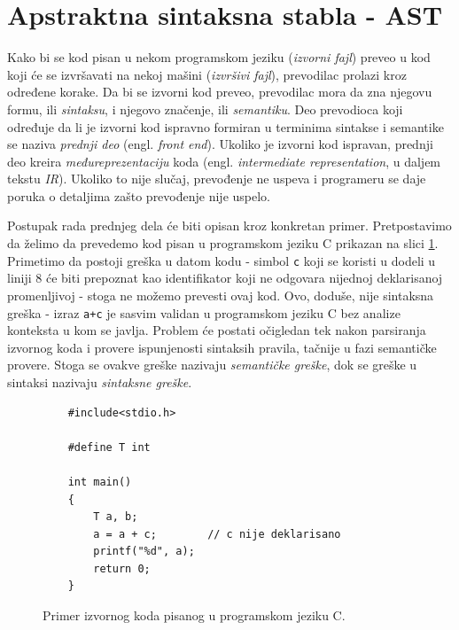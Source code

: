 \section{Apstraktna sintaksna stabla - AST}
\label{sec:AST}

Kako bi se kod pisan u nekom programskom jeziku (\emph{izvorni fajl}) preveo u kod koji će se izvršavati na nekoj mašini (\emph{izvršivi fajl}), prevodilac prolazi kroz određene korake. Da bi se izvorni kod preveo, prevodilac mora da zna njegovu formu, ili \emph{sintaksu}, i njegovo značenje, ili \emph{semantiku}. Deo prevodioca koji određuje da li je izvorni kod ispravno formiran u terminima sintakse i semantike se naziva \emph{prednji deo} (engl. \emph{front end}). Ukoliko je izvorni kod ispravan, prednji deo kreira \emph{međureprezentaciju} koda (engl. \emph{intermediate representation}, u daljem tekstu \emph{IR}). Ukoliko to nije slučaj, prevođenje ne uspeva i programeru se daje poruka o detaljima zašto prevođenje nije uspelo. \cite{EngineeringCompilers}

Postupak rada prednjeg dela će biti opisan kroz konkretan primer. Pretpostavimo da želimo da prevedemo kod pisan u programskom jeziku C prikazan na slici \ref{fig:CompilationProcessInit}. Primetimo da postoji greška u datom kodu - simbol \texttt{c} koji se koristi u dodeli u liniji $8$ će biti prepoznat kao identifikator koji ne odgovara nijednoj deklarisanoj promenljivoj - stoga ne možemo prevesti ovaj kod. Ovo, doduše, nije sintaksna greška - izraz \texttt{a+c} je sasvim validan u programskom jeziku C bez analize konteksta u kom se javlja. Problem će postati očigledan tek nakon parsiranja izvornog koda i provere ispunjenosti sintaksih pravila, tačnije u fazi semantičke provere. Stoga se ovakve greške nazivaju \emph{semantičke greške}, dok se greške u sintaksi nazivaju \emph{sintaksne greške}.

\begin{figure}[h!]
    \begin{lstlisting}
    #include<stdio.h>

    #define T int

    int main()
    {
        T a, b;
        a = a + c;        // c nije deklarisano
        printf("%d", a);
        return 0;
    }
    \end{lstlisting}
    \caption{Primer izvornog koda pisanog u programskom jeziku C.}
    \label{fig:CompilationProcessInit}
\end{figure}

